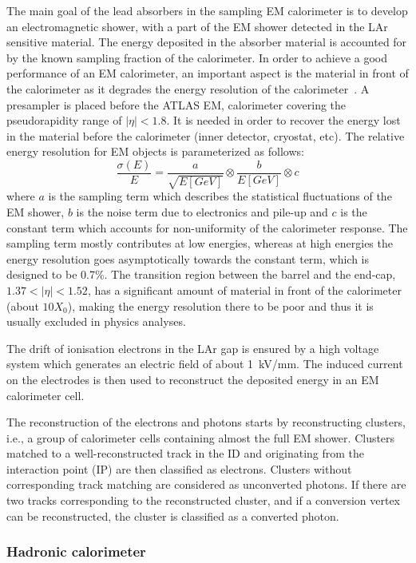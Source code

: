 The main goal of the lead absorbers in the sampling EM calorimeter is to develop an electromagnetic shower, with a part of the EM shower detected in the LAr sensitive material. The energy deposited in the absorber material is accounted for by the known sampling fraction of the calorimeter. In order to achieve a good performance of an EM calorimeter, an important aspect is the material in front of the calorimeter as it degrades the energy resolution of the calorimeter~\cite{electron_tight}.
A presampler is placed before the ATLAS EM, calorimeter covering the pseudorapidity range of $|\eta|<1.8$. It is needed in order to recover the energy lost in the material before the calorimeter (inner detector, cryostat, etc).
The relative energy resolution for EM objects is parameterized as follows:
\begin{equation}
\frac{\sigma(E)}{E}=\frac{a}{\sqrt{E[GeV]}}\otimes\frac{b}{E[GeV]}\otimes c
\end{equation}
where $a$ is the sampling term which describes the statistical fluctuations of the EM shower, $b$ is the noise term due to electronics and pile-up and $c$ is the constant term which accounts for non-uniformity of the calorimeter response. The sampling term mostly contributes at low energies, whereas at high energies the energy resolution goes asymptotically towards the constant term, which is designed to be 0.7\%.
The transition region between the barrel and the end-cap, $1.37<|\eta|<1.52$, has a significant amount of material in front of the calorimeter (about $ 10 X_0$), making the energy resolution there to be poor and thus it is usually excluded in physics analyses.

The drift of ionisation electrons in the LAr gap is ensured by a high voltage system which generates an electric field of about 1~kV/mm. The induced current on the electrodes is then used to reconstruct the deposited energy in an EM calorimeter cell.

The reconstruction of the electrons and photons starts by reconstructing clusters, i.e., a group of calorimeter cells containing almost the full EM shower. Clusters matched to a well-reconstructed track in the ID and originating from the interaction point (IP) are then classified as electrons. Clusters without corresponding track matching are considered as unconverted photons. If there are two tracks corresponding to the reconstructed cluster, and if a conversion vertex can be reconstructed, the cluster is classified as a converted photon.

\subsubsection{Hadronic calorimeter}

